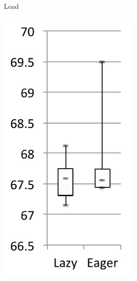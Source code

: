 \documentclass[sigplan,10pt,screen]{acmart}\settopmatter{printfolios=true,printccs=true,printacmref=true}
\begin{document}
\begin{figure}[bth]
\begin{subfigure}[b]{.48\textwidth}
\begin{subfigure}[b]{.28\textwidth}
		\caption{Load}
   	\end{subfigure}\hspace{.03\textwidth}%
   	\begin{subfigure}[b]{.28\textwidth}
		\includegraphics[width=\linewidth]{figures/netBeansExpExecTime} 

\end{subfigure}
\end{subfigure}
\end{figure}
\end{document}
